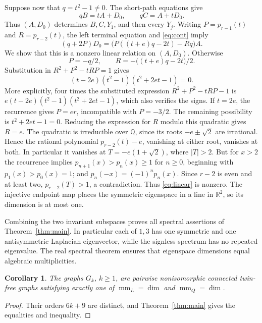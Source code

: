 \documentclass[11pt]{article}
\newtheorem{corollary}[theorem]{Corollary}
\newcommand{\mm}{\operatorname{mm}}
\begin{document}
Suppose now that $q=t^2-1\ne0$. The short-path equations give
\[
 qB=tA+D_0,\qquad qC=A+tD_0.
\]
Thus $(A,D_0)$ determines $B,C,Y_1$, and then every $Y_j$.
Writing $P=p_{r-1}(t)$ and $R=p_{r-2}(t)$, the left terminal equation
and \eqref{eq:cont} imply
\begin{equation}\label{eq:linear}
 (q+2P)D_0=\bigl(P((t+e)q-2t)-Rq\bigr)A.
\end{equation}
We show that this is a nonzero linear relation on $(A,D_0)$.
Otherwise
\[
 P=-q/2,\qquad R=-\bigl((t+e)q-2t\bigr)/2.
\]
Substitution in $R^2+P^2-tRP=1$ gives
\begin{equation}\label{eq:factor}
 (t-2e)(t^2-1)(t^2+2et-1)=0.
\end{equation}
More explicitly, four times the substituted expression $R^2+P^2-tRP-1$ is
$e(t-2e)(t^2-1)(t^2+2et-1)$, which also verifies the signs.
If $t=2e$, the recurrence gives $P=er$, incompatible with $P=-3/2$.
The remaining possibility is $t^2+2et-1=0$. Reducing the expression
for $R$ modulo this quadratic gives $R=e$.
The quadratic is irreducible over $\mathbb Q$, since its roots
$-e\pm\sqrt2$ are irrational. Hence the rational polynomial
$p_{r-2}(t)-e$, vanishing at either root, vanishes at both.
In particular it vanishes at $T=-e(1+\sqrt2)$, where $|T|>2$.
But for $x>2$ the recurrence implies
$p_{n+1}(x)>p_n(x)\geq1$ for $n\geq0$, beginning with
$p_1(x)>p_0(x)=1$; and $p_n(-x)=(-1)^np_n(x)$.
Since $r-2$ is even and at least two, $p_{r-2}(T)>1$, a contradiction.
Thus \eqref{eq:linear} is nonzero. The injective endpoint map places
the symmetric eigenspace in a line in $\mathbb R^2$, so its dimension
is at most one.

Combining the two invariant subspaces proves all spectral assertions
of Theorem~\ref{thm:main}. In particular each of $1,3$ has one symmetric
and one antisymmetric Laplacian eigenvector, while the signless spectrum
has no repeated eigenvalue. The real spectral theorem ensures that
eigenspace dimensions equal algebraic multiplicities.

\begin{corollary}
The graphs $G_k$, $k\geq1$, are pairwise nonisomorphic connected twin-free
graphs satisfying exactly one of $\mm_L=\dim$ and $\mm_Q=\dim$.
\end{corollary}
\begin{proof}
Their orders $6k+9$ are distinct, and Theorem~\ref{thm:main} gives the
equalities and inequality.
\end{proof}
\end{document}
